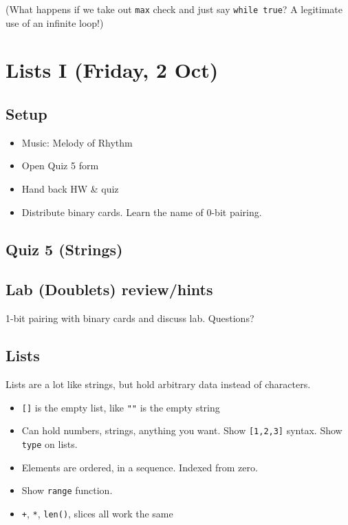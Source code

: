 \documentclass{article}
\begin{document}
(What happens if we take out \verb|max| check and just say
\verb|while true|?  A legitimate use of an infinite loop!)

\newpage
\section*{Lists I (Friday, 2 Oct)}

\subsection*{Setup}
\begin{itemize}
\item Music: Melody of Rhythm
\item Open Quiz 5 form
\item Hand back HW \& quiz
\item Distribute binary cards.  Learn the name of 0-bit pairing.
\end{itemize}

\subsection*{Quiz 5 (Strings)}

\subsection*{Lab (Doublets) review/hints}

1-bit pairing with binary cards and discuss lab.  Questions?

\subsection*{Lists}

Lists are a lot like strings, but hold arbitrary data instead of
characters.
\begin{itemize}
\item \verb|[]| is the empty list, like \verb|""| is the empty string
\item Can hold numbers, strings, anything you want.  Show
  \verb|[1,2,3]| syntax.  Show \verb|type| on lists.
\item Elements are ordered, in a sequence.  Indexed from zero.
\item Show \verb|range| function.
\item \verb|+|, \verb|*|, \verb|len()|, slices all work the same
\end{itemize}
\end{document}
